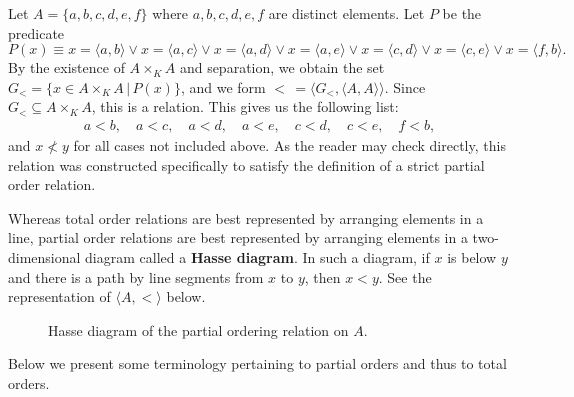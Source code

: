 \begin{example}\label{ch1ex_rel_partialorder}
	Let $A = \{a, b, c, d, e, f\}$ where $a, b, c, d, e, f$ are distinct elements.
	Let $P$ be the predicate
	\[ P(x)\equiv x = \langle a, b\rangle \lor x = \langle a, c\rangle \lor x = \langle a, d\rangle \lor x = \langle a, e\rangle \lor x = \langle c, d\rangle \lor x = \langle c, e\rangle \lor x = \langle f, b\rangle. \]
	By the existence of $A\times_{K} A$ and separation, we obtain the set $G_{<} = \{x\in A\times_{K} A \,|\, P(x)\}$, and we form $<\, = \langle G_{<}, \langle A, A\rangle\rangle$. 
	Since $G_{<}\subseteq A\times_{K} A$, this is a relation. 
	This gives us the following list:
	\begin{align*}
		a < b, \quad a < c, \quad a < d, \quad a < e, \quad c < d, \quad c < e, \quad f < b,
	\end{align*}
	and $x \not< y$ for all cases not included above. 
	As the reader may check directly, this relation was constructed specifically to satisfy the definition of a strict partial order relation. 
	
	Whereas total order relations are best represented by arranging elements in a line, partial order relations are best represented by arranging elements in a two-dimensional diagram called a \textbf{Hasse diagram}. 
	In such a diagram, if $x$ is below $y$ and there is a path by line segments from $x$ to $y$, then $x < y$. 
	See the representation of $\langle A, <\rangle$ below.
	
	\begin{figure}[H]
		\centering
		\caption{Hasse diagram of the partial ordering relation on $A$.}
	\end{figure}
\end{example}

Below we present some terminology pertaining to partial orders and thus to total orders.

